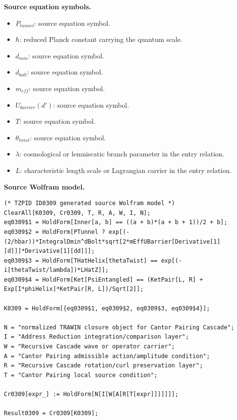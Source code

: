 \begin{minipage}[t]{0.49\linewidth}
\begingroup
\small
\raggedright
\textbf{Source equation symbols.}\par
\begin{itemize}[leftmargin=1.35em,itemsep=1pt,topsep=1pt,parsep=0pt]
    \item $P_{tunnel}$: source equation symbol.
    \item $\hbar$: reduced Planck constant carrying the quantum scale.
    \item $d_{min}$: source equation symbol.
    \item $d_{bolt}$: source equation symbol.
    \item $m_{eff}$: source equation symbol.
    \item $U_{barrier}(d')$: source equation symbol.
    \item $T$: source equation symbol.
    \item $\theta_{twist}$: source equation symbol.
    \item $\lambda$: cosmological or lemniscatic branch parameter in the entry relation.
    \item $L$: characteristic length scale or Lagrangian carrier in the entry relation.
\end{itemize}
\endgroup
\end{minipage}\hfill
\begin{minipage}[t]{0.47\linewidth}
\begingroup
\scriptsize
\raggedright
\textbf{Source Wolfram model.}\par
\begin{Verbatim}[fontsize=\tiny,breaklines=true,breakanywhere=true]
(* TZPID ID0309 generated source Wolfram model *)
ClearAll[K0309, Cr0309, T, R, A, W, I, N];
eq0309$1 = HoldForm[Inner[a, b] == ((a + b)*(a + b + 1))/2 + b];
eq0309$2 = HoldForm[PTunnel ? exp[(-(2/hbar))*IntegralDmin^dBolt*sqrt[2*mEffUBarrier[Derivative[1][d]]]*Derivative[1][dd]]];
eq0309$3 = HoldForm[THatHelix[thetaTwist] == exp[(-i[thetaTwist/lambda])*LHatZ]];
eq0309$4 = HoldForm[Ket[PsiEntangled] == (KetPair[L, R] + Exp[I*phiHelix]*KetPair[R, L])/Sqrt[2]];

K0309 = HoldForm[{eq0309$1, eq0309$2, eq0309$3, eq0309$4}];

N = "normalized TRAWIN closure object for Cantor Pairing Cascade";
I = "Address Reduction integration/comparison layer";
W = "Recursive Cascade wave or operator carrier";
A = "Cantor Pairing admissible action/amplitude condition";
R = "Recursive Cascade rotation/curl preservation layer";
T = "Cantor Pairing local source condition";

Cr0309[expr_] := HoldForm[N[I[W[A[R[T[expr]]]]]]];

Result0309 = Cr0309[K0309];
\end{Verbatim}
\endgroup
\end{minipage}

